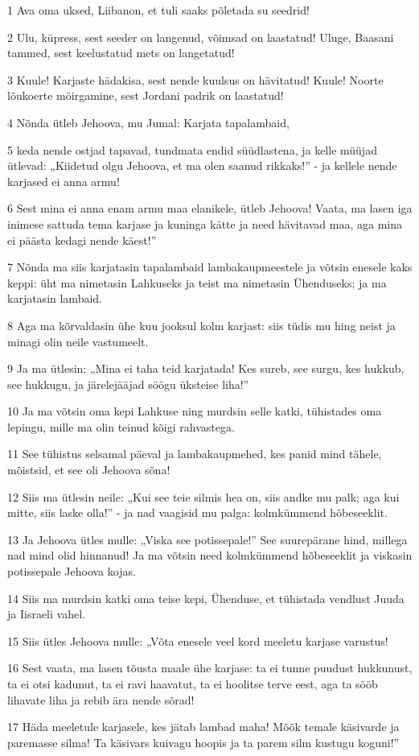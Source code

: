 \par 1 Ava oma uksed, Liibanon, et tuli saaks põletada su seedrid!
\par 2 Ulu, küpress, sest seeder on langenud, võimsad on laastatud! Uluge, Baasani tammed, sest keelustatud mets on langetatud!
\par 3 Kuule! Karjaste hädakisa, sest nende kuulsus on hävitatud! Kuule! Noorte lõukoerte möirgamine, sest Jordani padrik on laastatud!
\par 4 Nõnda ütleb Jehoova, mu Jumal: Karjata tapalambaid,
\par 5 keda nende ostjad tapavad, tundmata endid süüdlastena, ja kelle müüjad ütlevad: „Kiidetud olgu Jehoova, et ma olen saanud rikkaks!” - ja kellele nende karjased ei anna armu!
\par 6 Sest mina ei anna enam armu maa elanikele, ütleb Jehoova! Vaata, ma lasen iga inimese sattuda tema karjase ja kuninga kätte ja need hävitavad maa, aga mina ei päästa kedagi nende käest!”
\par 7 Nõnda ma siis karjatasin tapalambaid lambakaupmeestele ja võtsin enesele kaks keppi: üht ma nimetasin Lahkuseks ja teist ma nimetasin Ühenduseks; ja ma karjatasin lambaid.
\par 8 Aga ma kõrvaldasin ühe kuu jooksul kolm karjast: siis tüdis mu hing neist ja minagi olin neile vastumeelt.
\par 9 Ja ma ütlesin: „Mina ei taha teid karjatada! Kes sureb, see surgu, kes hukkub, see hukkugu, ja järelejääjad söögu üksteise liha!”
\par 10 Ja ma võtsin oma kepi Lahkuse ning murdsin selle katki, tühistades oma lepingu, mille ma olin teinud kõigi rahvastega.
\par 11 See tühistus selsamal päeval ja lambakaupmehed, kes panid mind tähele, mõistsid, et see oli Jehoova sõna!
\par 12 Siis ma ütlesin neile: „Kui see teie silmis hea on, siis andke mu palk; aga kui mitte, siis laske olla!” - ja nad vaagisid mu palga: kolmkümmend hõbeseeklit.
\par 13 Ja Jehoova ütles mulle: „Viska see potissepale!” See suurepärane hind, millega nad mind olid hinnanud! Ja ma võtsin need kolmkümmend hõbeseeklit ja viskasin potissepale Jehoova kojas.
\par 14 Siis ma murdsin katki oma teise kepi, Ühenduse, et tühistada vendlust Juuda ja Iisraeli vahel.
\par 15 Siis ütles Jehoova mulle: „Võta enesele veel kord meeletu karjase varustus!
\par 16 Sest vaata, ma lasen tõusta maale ühe karjase: ta ei tunne puudust hukkunust, ta ei otsi kadunut, ta ei ravi haavatut, ta ei hoolitse terve eest, aga ta sööb lihavate liha ja rebib ära nende sõrad!
\par 17 Häda meeletule karjasele, kes jätab lambad maha! Mõõk temale käsivarde ja paremasse silma! Ta käsivars kuivagu hoopis ja ta parem silm kustugu koguni!”


